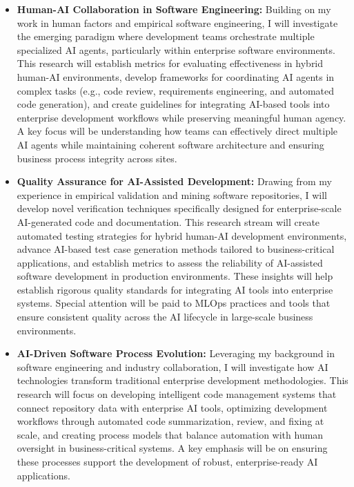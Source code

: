 \begin{itemize}
\item \textbf{Human-AI Collaboration in Software Engineering:} 
Building on my work in human factors and empirical software engineering, I will investigate the emerging paradigm where development teams orchestrate multiple specialized AI agents, particularly within enterprise software environments. This research will establish metrics for evaluating effectiveness in hybrid human-AI environments, develop frameworks for coordinating AI agents in complex tasks (e.g., code review, requirements engineering, and automated code generation), and create guidelines for integrating AI-based tools into enterprise development workflows while preserving meaningful human agency. A key focus will be understanding how teams can effectively direct multiple AI agents while maintaining coherent software architecture and ensuring business process integrity across sites.
\item \textbf{Quality Assurance for AI-Assisted Development:} 
Drawing from my experience in empirical validation and mining software repositories, I will develop novel verification techniques specifically designed for enterprise-scale AI-generated code and documentation. 
This research stream will create automated testing strategies for hybrid human-AI development environments, advance AI-based test case generation methods tailored to business-critical applications, and establish metrics to assess the reliability of AI-assisted software development in production environments. These insights will help establish rigorous quality standards for integrating AI tools into enterprise systems. Special attention will be paid to MLOps practices and tools that ensure consistent quality across the AI lifecycle in large-scale business environments.
\item \textbf{AI-Driven Software Process Evolution:} 
Leveraging my background in software engineering and industry collaboration, I will investigate how AI technologies transform traditional enterprise development methodologies. This research will focus on developing intelligent code management systems that connect repository data with enterprise AI tools, optimizing development workflows through automated code summarization, review, and fixing at scale, and creating process models that balance automation with human oversight in business-critical systems. A key emphasis will be on ensuring these processes support the development of robust, enterprise-ready AI applications.
\end{itemize}

